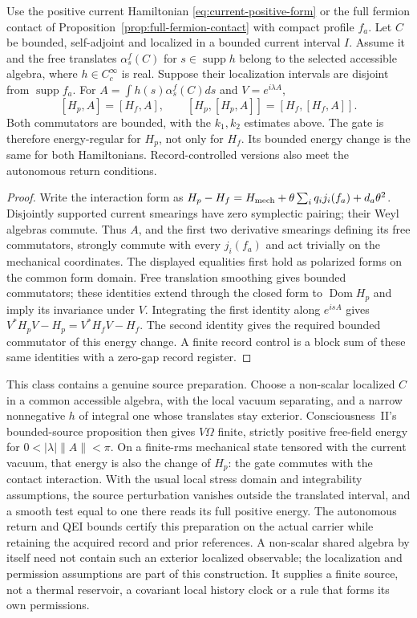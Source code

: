 \begin{proposition}
\label{prop:exterior-source-gate}
Use the positive current Hamiltonian \eqref{eq:current-positive-form}
or the full fermion contact of Proposition~\ref{prop:full-fermion-contact}
with compact profile $f_a$. Let $C$ be bounded, self-adjoint and localized
in a bounded current interval $I$. Assume it and the free translates
$\alpha_s^f(C)$ for $s\in\operatorname{supp}h$ belong to the selected
accessible algebra, where $h\in C_c^\infty$ is real. Suppose their
localization intervals are disjoint from $\operatorname{supp}f_a$.
For $A=\int h(s)\alpha_s^f(C)ds$ and $V=e^{i\lambda A}$,
\[
 [H_p,A]=[H_f,A],\qquad
 [H_p,[H_p,A]]=[H_f,[H_f,A]].
\]
Both commutators are bounded, with the $k_1,k_2$ estimates above.
The gate is therefore energy-regular for $H_p$, not only for $H_f$.
Its bounded energy change is the same for both Hamiltonians.
Record-controlled versions also meet the autonomous return conditions.
\end{proposition}
\begin{proof}
Write the interaction form as
$H_p-H_f=H_{\rm mech}+\theta\sum_iq_i j_i(f_a)+d_a\theta^2$.
Disjointly supported current smearings have zero symplectic pairing;
their Weyl algebras commute. Thus $A$, and the first two derivative
smearings defining its free commutators, strongly commute with every
$j_i(f_a)$ and act trivially on the mechanical coordinates.
The displayed equalities first hold as polarized forms on the common
form domain. Free translation smoothing gives bounded commutators;
these identities extend through the closed form to
$\operatorname{Dom}H_p$ and imply its invariance under $V$.
Integrating the first identity along $e^{isA}$ gives
$V^*H_pV-H_p=V^*H_fV-H_f$. The second identity gives the required
bounded commutator of this energy change. A finite record control
is a block sum of these same identities with a zero-gap record register.
\end{proof}

This class contains a genuine source preparation. Choose a non-scalar
localized $C$ in a common accessible algebra, with the local vacuum
separating, and a narrow nonnegative $h$ of integral one whose translates
stay exterior. Consciousness~II's bounded-source proposition then gives
$V\Omega$ finite, strictly positive free-field energy for
$0<|\lambda|\|A\|<\pi$. On a finite-rms mechanical state tensored with
the current vacuum, that energy is also the change of $H_p$: the gate
commutes with the contact interaction. With the usual local stress
domain and integrability assumptions, the source perturbation vanishes
outside the translated interval, and a smooth test equal to one there
reads its full positive energy. The autonomous return and QEI bounds
certify this preparation on the actual carrier while retaining the
acquired record and prior references. A non-scalar shared algebra by
itself need not contain such an exterior localized observable; the
localization and permission assumptions are part of this construction.
It supplies a finite source, not a thermal reservoir, a covariant local
history clock or a rule that forms its own permissions.

